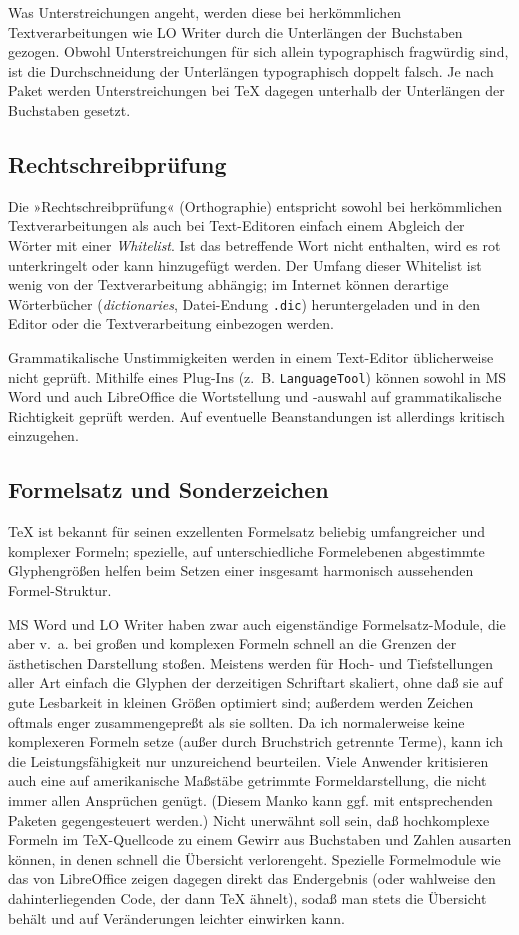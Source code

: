 \documentclass[11pt,a4paper,ngerman,DIV=8]{scrartcl}
\begin{document}
Was Unterstreichungen angeht, werden diese bei herkömmlichen Textverarbeitungen wie LO Writer durch die Unterlängen der Buchstaben gezogen. Obwohl Unterstreichungen für sich allein typographisch fragwürdig sind, ist die Durchschneidung der Unterlängen typographisch doppelt falsch. Je nach Paket werden Unterstreichungen bei \TeX{} dagegen unterhalb der Unterlängen der Buchstaben gesetzt.

\subsection{Rechtschreibprüfung}

Die »Rechtschreibprüfung« (Orthographie) entspricht sowohl bei herkömmlichen Textverarbeitungen als auch bei Text-Editoren einfach einem Abgleich der Wörter mit einer \emph{Whitelist}. Ist das betreffende Wort nicht enthalten, wird es rot unterkringelt oder kann hinzugefügt werden. Der Umfang dieser Whitelist ist wenig von der Textverarbeitung abhängig; im Internet können derartige Wörterbücher (\emph{dictionaries}, Datei-Endung \texttt{.dic}) heruntergeladen und in den Editor oder die Textverarbeitung einbezogen werden.

Grammatikalische Unstimmigkeiten werden in einem Text-Editor üblicherweise nicht geprüft. Mithilfe eines Plug-Ins (z.~B. \texttt{LanguageTool}) können sowohl in MS Word und auch LibreOffice die Wortstellung und -auswahl auf grammatikalische Richtigkeit geprüft werden. Auf eventuelle Beanstandungen ist allerdings kritisch einzugehen.

\subsection{Formelsatz und Sonderzeichen}

\TeX{} ist bekannt für seinen exzellenten Formelsatz beliebig umfangreicher und komplexer Formeln; spezielle, auf unterschiedliche Formelebenen abgestimmte Glyphengrößen helfen beim Setzen einer insgesamt harmonisch aussehenden Formel-Struktur.

MS Word und LO Writer haben zwar auch eigenständige Formelsatz-Module, die aber v.~a. bei großen und komplexen Formeln schnell an die Grenzen der ästhetischen Darstellung stoßen. Meistens werden für Hoch- und Tiefstellungen aller Art einfach die Glyphen der derzeitigen Schriftart skaliert, ohne daß sie auf gute Lesbarkeit in kleinen Größen optimiert sind; außerdem werden Zeichen oftmals enger zusammengepreßt als sie sollten. Da ich normalerweise keine komplexeren Formeln setze (außer durch Bruchstrich getrennte Terme), kann ich die Leistungsfähigkeit nur unzureichend beurteilen. Viele Anwender kritisieren auch eine auf amerikanische Maßstäbe getrimmte Formeldarstellung, die nicht immer allen Ansprüchen genügt. (Diesem Manko kann ggf. mit entsprechenden Paketen gegengesteuert werden.) Nicht unerwähnt soll sein, daß hochkomplexe Formeln im \TeX{}-Quellcode zu einem Gewirr aus Buchstaben und Zahlen ausarten können, in denen schnell die Übersicht verlorengeht. Spezielle Formelmodule wie das von LibreOffice zeigen dagegen direkt das Endergebnis (oder wahlweise den dahinterliegenden Code, der dann \TeX{} ähnelt), sodaß man stets die Übersicht behält und auf Veränderungen leichter einwirken kann.
\end{document}
